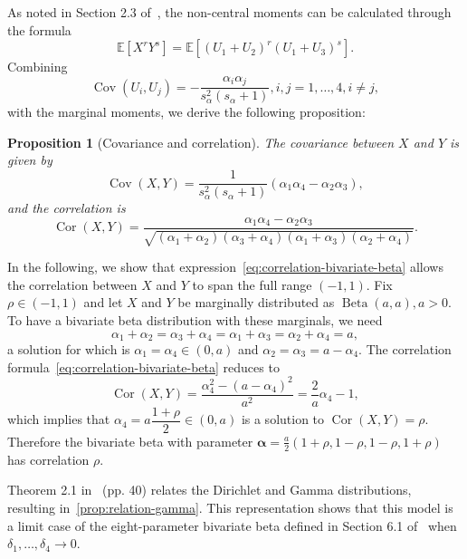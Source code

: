 \documentclass[a4paper, notitlepage, 10pt]{article}
\newcommand{\ev}{\mathbb{E}}
\newcommand{\cor}{\operatorname{Cor}}
\newcommand{\cov}{\operatorname{Cov}}
\newtheorem{proposition}{Proposition}[]
\theoremstyle{definition}
\begin{document}
As noted in Section 2.3 of~\cite{olkin2015constructions}, the non-central moments can be calculated through the formula
\[
\ev[X^r Y^s] = \ev[{(U_1 + U_2)}^r{(U_1 + U_3)}^s].
\]
Combining~\cite[p. 39]{ng2011dirichlet}
\begin{equation}
    \label{eq:covariance-dirichlet}
    \cov(U_i, U_j) = -\frac{\alpha_i \alpha_j}{s_{\alpha}^2(s_{\alpha} + 1)}, i,j = 1, \dots, 4, i \neq j,
\end{equation}
with the marginal moments, we derive the following proposition:

\begin{proposition}[Covariance and correlation]\label{prop:covariance-correlation}
  The covariance between $X$ and $Y$ is given by
  \begin{equation}
      \label{eq:covariance-bivariate-beta}
      \cov(X,Y) = \frac{1}{s_{\alpha}^2(s_{\alpha}+1)}(\alpha_1\alpha_4 - \alpha_2\alpha_3),
  \end{equation}
  and the correlation is
  \begin{equation}
     \label{eq:correlation-bivariate-beta}
     \cor(X,Y) = \frac{\alpha_1\alpha_4 - \alpha_2\alpha_3}{\sqrt{(\alpha_1+\alpha_2)(\alpha_3+\alpha_4)(\alpha_1+\alpha_3)(\alpha_2+\alpha_4)}}.
  \end{equation}
\end{proposition}

In the following, we show that expression~\eqref{eq:correlation-bivariate-beta} allows the correlation between $X$ and $Y$ to span the full range $(-1,1)$. 
Fix $\rho \in (-1,1)$ and let $X$ and $Y$ be marginally distributed as $\operatorname{Beta}(a,a), a>0$. 
To have a bivariate beta distribution with these marginals, we need
\[
\alpha_1 +
\alpha_2 = \alpha_3 + \alpha_4 = \alpha_1 + \alpha_3 = \alpha_2 + \alpha_4 = a,
\]
a solution for which is $\alpha_1 = \alpha_4 \in (0,a)$ and $\alpha_2 = \alpha_3 = a - \alpha_4$. 
The correlation formula~\eqref{eq:correlation-bivariate-beta} reduces to 
\[
\cor(X,Y) = \frac{\alpha_4^2 - {(a - \alpha_4)}^2}{a^2} = \frac{2}{a}\alpha_4 - 1,
\]
which implies that $\alpha_4 = a\dfrac{1 + \rho}{2} \in (0,a)$ is a solution to $\cor(X,Y) = \rho$. 
Therefore the bivariate beta with parameter $\boldsymbol{\alpha} = \frac{a}{2}(1 + \rho, 1 - \rho, 1 - \rho, 1 + \rho)$ has correlation $\rho$.

Theorem 2.1 in~\cite{ng2011dirichlet} (pp. 40) relates the Dirichlet and Gamma distributions, resulting in~\autoref{prop:relation-gamma}. 
This representation shows that this model is a limit case of the eight-parameter bivariate beta defined in Section 6.1 of~\cite{arnold2011flexible} when $\delta_1, \dots, \delta_4 \to 0$.
\end{document}
